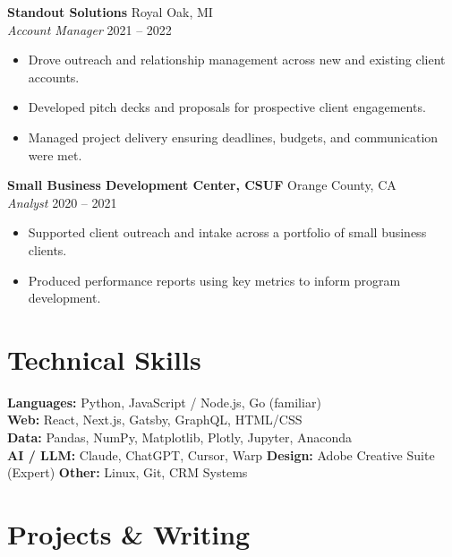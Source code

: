 \documentclass[10pt, letterpaper]{article}
\begin{document}
\vspace{3pt}

\noindent\textbf{Standout Solutions} \hfill Royal Oak, MI \\
\textit{Account Manager} \hfill 2021 -- 2022
\begin{itemize}
  \item Drove outreach and relationship management across new and existing client accounts.
  \item Developed pitch decks and proposals for prospective client engagements.
  \item Managed project delivery ensuring deadlines, budgets, and communication were met.
\end{itemize}

\vspace{3pt}

\noindent\textbf{Small Business Development Center, CSUF} \hfill Orange County, CA \\
\textit{Analyst} \hfill 2020 -- 2021
\begin{itemize}
  \item Supported client outreach and intake across a portfolio of small business clients.
  \item Produced performance reports using key metrics to inform program development.
\end{itemize}

\section{Technical Skills}

\noindent
\textbf{Languages:} Python, JavaScript / Node.js, Go (familiar) \\
\textbf{Web:} React, Next.js, Gatsby, GraphQL, HTML/CSS \\
\textbf{Data:} Pandas, NumPy, Matplotlib, Plotly, Jupyter, Anaconda \\
\textbf{AI / LLM:} Claude, ChatGPT, Cursor, Warp \quad
\textbf{Design:} Adobe Creative Suite (Expert) \quad
\textbf{Other:} Linux, Git, CRM Systems

\section{Projects \& Writing}
\end{document}
